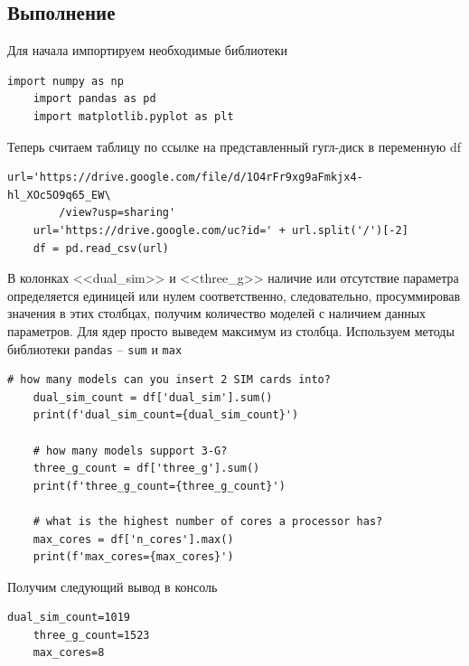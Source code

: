 \documentclass[a4paper, 12pt]{article}
\begin{document}
    \subsection{Выполнение}
    Для начала импортируем необходимые библиотеки
    \begin{lstlisting}[label=import, caption={Импортирование библиотек}]
    import numpy as np
    import pandas as pd
    import matplotlib.pyplot as plt
    \end{lstlisting}


    Теперь считаем таблицу по ссылке на представленный гугл-диск в переменную df
    \begin{lstlisting}[label=read, caption={Считывание таблицы}]
    url='https://drive.google.com/file/d/1O4rFr9xg9aFmkjx4-hl_XOc5O9q65_EW\
        /view?usp=sharing'
    url='https://drive.google.com/uc?id=' + url.split('/')[-2]
    df = pd.read_csv(url)
    \end{lstlisting}


    В колонках <<dual\_{sim}>> и <<three\_{g}>> наличие или отсутствие параметра определяется
    единицей или нулем соответственно, следовательно, просуммировав значения в этих столбцах,
    получим количество моделей с наличием данных параметров. Для ядер просто выведем максимум
    из столбца. Используем методы библиотеки \texttt{pandas} -- \texttt{sum} и \texttt{max}
    \begin{lstlisting}[label=3q, caption={Код на ответы на первые три вопроса}]
    # how many models can you insert 2 SIM cards into?
    dual_sim_count = df['dual_sim'].sum()
    print(f'dual_sim_count={dual_sim_count}')
        
    # how many models support 3-G?
    three_g_count = df['three_g'].sum()
    print(f'three_g_count={three_g_count}')
        
    # what is the highest number of cores a processor has?
    max_cores = df['n_cores'].max()
    print(f'max_cores={max_cores}')
    \end{lstlisting}

    
    Получим следующий вывод в консоль
    \begin{lstlisting}[label=3qa, caption={Вывод в консоль: ответы на первые три вопроса}]
    dual_sim_count=1019
    three_g_count=1523
    max_cores=8
    \end{lstlisting}
\end{document}
